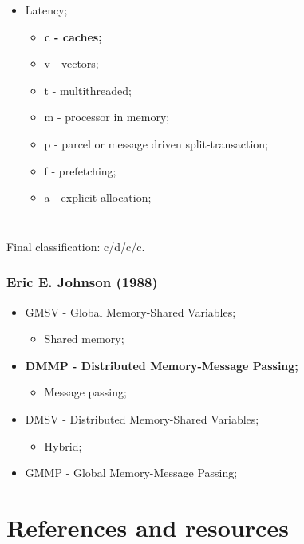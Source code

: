 \documentclass{beamer}
\begin{document}
\begin{frame}
\begin{columns}
    \begin{itemize}
      \item Latency;
            \begin{itemize}
              \item \textbf{c - caches;}
              \item v - vectors;
              \item t - multithreaded;
              \item m - processor in memory;
              \item p - parcel or message driven split-transaction;
              \item f - prefetching;
              \item a - explicit allocation;
            \end{itemize}
    \end{itemize}
  \end{columns}
  \bigbreak
  \bigbreak
  Final classification: c/d/c/c.
\end{frame}

\begin{frame}
  \frametitle{Eric E. Johnson (1988)}
  \begin{itemize}
    \item GMSV - Global Memory-Shared Variables;
          \begin{itemize}
            \item Shared memory;
          \end{itemize}
    \item \textbf{DMMP - Distributed Memory-Message Passing;}
          \begin{itemize}
            \item Message passing;
          \end{itemize}
    \item DMSV - Distributed Memory-Shared Variables;
          \begin{itemize}
            \item Hybrid;
          \end{itemize}
    \item GMMP - Global Memory-Message Passing;
  \end{itemize}
\end{frame}


\section{References and resources}
\end{document}
